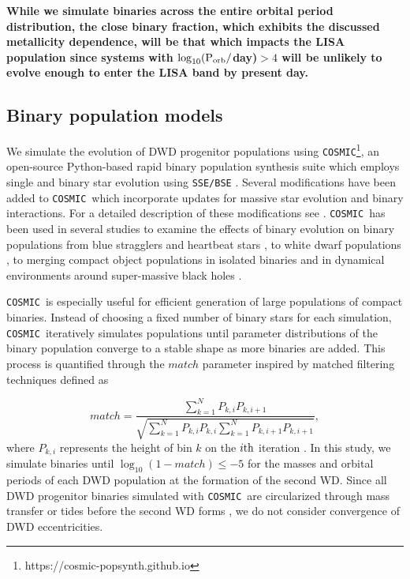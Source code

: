 \documentclass[twocolumn, linenumbers]{aastex631}
\newcommand{\cosmic}{\texttt{COSMIC}}
\begin{document}
\textbf{While we simulate binaries across the entire orbital period distribution, the close binary fraction, which exhibits the discussed metallicity dependence, will be that which impacts the LISA population since systems with $\log_{10}(\rm{P}_{\rm{orb}}/$day)$>4$ will be unlikely to evolve enough to enter the LISA band by present day.}


\subsection{Binary population models}
\label{sec:bin_pop}
We simulate the evolution of DWD progenitor populations using \cosmic\footnote{https://cosmic-popsynth.github.io}, an open-source Python-based rapid binary population synthesis suite which employs single and binary star evolution using \texttt{SSE/BSE} \citep{Hurley2000, Hurley2002}. Several modifications have been added to \cosmic\ which incorporate updates for massive star evolution and binary interactions. For a detailed description of these modifications see \citet{Breivik2020a}. \cosmic\ has been used in several studies to examine the effects of binary evolution on binary populations from blue stragglers \citep{Leiner2021} and heartbeat stars \citep{Jayasinghe2021}, to white dwarf populations \citep{Kremer2017,Breivik2018,Kilic2021}, to merging compact object populations in isolated binaries \citep{Zevin2020b, Zevin2020a, Zevin2021, Wong2021, Mandhai2021} and in dynamical environments around super-massive black holes \citep{Stephan2019, Wang2021}. 

\cosmic\ is especially useful for efficient generation of large populations of compact binaries. Instead of choosing a fixed number of binary stars for each simulation, \cosmic\ iteratively simulates populations until parameter distributions of the binary population converge to a stable shape as more binaries are added. This process is quantified through the $match$ parameter inspired by matched filtering techniques \citep[e.g. Eq. 6 of ][]{Chatziioannou2017} defined as

\begin{equation}
   match = \frac{\sum_{k=1}^{N}P_{k,i}P_{k,i+1}}{\sqrt{\sum_{k=1}^{N}P_{k,i}P_{k,i}\sum_{k=1}^{N}P_{k,i+1}P_{k,i+1}}},
\end{equation}
where $P_{k,i}$ represents the height of bin $k$ on the $i\rm{th}$ iteration \citep{Breivik2020a}. In this study, we simulate binaries until $\log_{10}(1-match) \leq -5$ for the masses and orbital periods of each DWD population at the formation of the second WD. Since all DWD progenitor binaries simulated with \cosmic\ are circularized through mass transfer or tides before the second WD forms \citep[e.g.][]{Marsh2004, Gokhale2007, Sepinsky2014, Kremer2015}, we do not consider convergence of DWD eccentricities.
\end{document}
